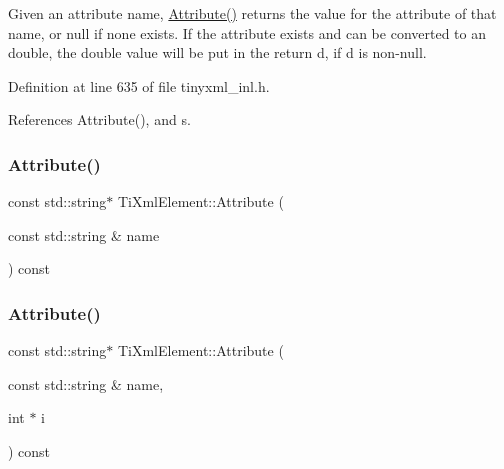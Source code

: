 Given an attribute name, \hyperlink{class_ti_xml_element_a6042f518748f475a7ac4b4e0b509eb05}{Attribute()} returns the value for the attribute of that name, or null if none exists. If the attribute exists and can be converted to an double, the double value will be put in the return \textquotesingle{}d\textquotesingle{}, if \textquotesingle{}d\textquotesingle{} is non-\/null. 

Definition at line 635 of file tinyxml\+\_\+inl.\+h.



References Attribute(), and s.

\hypertarget{class_ti_xml_element_a9c3d9bfacd95cf549fcd859238bb8f93}{}\label{class_ti_xml_element_a9c3d9bfacd95cf549fcd859238bb8f93} 
\subsubsection{\texorpdfstring{Attribute()}{Attribute()}\hspace{0.1cm}{\footnotesize\ttfamily [4/6]}}
{\footnotesize\ttfamily const std\+::string$\ast$ Ti\+Xml\+Element\+::\+Attribute (\begin{DoxyParamCaption}\item[{const std\+::string \&}]{name }\end{DoxyParamCaption}) const}

\hypertarget{class_ti_xml_element_a51227b271c63c370eb3477b25a529606}{}\label{class_ti_xml_element_a51227b271c63c370eb3477b25a529606} 
\subsubsection{\texorpdfstring{Attribute()}{Attribute()}\hspace{0.1cm}{\footnotesize\ttfamily [5/6]}}
{\footnotesize\ttfamily const std\+::string$\ast$ Ti\+Xml\+Element\+::\+Attribute (\begin{DoxyParamCaption}\item[{const std\+::string \&}]{name,  }\item[{int $\ast$}]{i }\end{DoxyParamCaption}) const}

\hypertarget{class_ti_xml_element_abf7279768e400864271dc163258bb1e9}{}\label{class_ti_xml_element_abf7279768e400864271dc163258bb1e9} 
